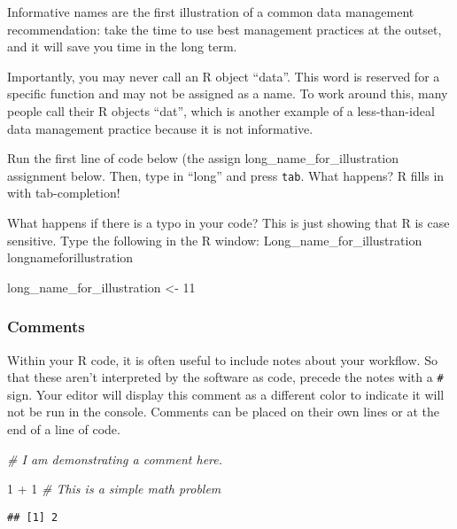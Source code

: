 \documentclass[
]{article}
\newenvironment{Shaded}{\begin{snugshade}}{\end{snugshade}}
\newcommand{\CommentTok}[1]{\textcolor[rgb]{0.56,0.35,0.01}{\textit{#1}}}
\newcommand{\DecValTok}[1]{\textcolor[rgb]{0.00,0.00,0.81}{#1}}
\newcommand{\NormalTok}[1]{#1}
\newcommand{\OtherTok}[1]{\textcolor[rgb]{0.56,0.35,0.01}{#1}}
\newcommand{\SpecialCharTok}[1]{\textcolor[rgb]{0.00,0.00,0.00}{#1}}
\begin{document}
Informative names are the first illustration of a common data management
recommendation: take the time to use best management practices at the
outset, and it will save you time in the long term.

Importantly, you may never call an R object ``data''. This word is
reserved for a specific function and may not be assigned as a name. To
work around this, many people call their R objects ``dat'', which is
another example of a less-than-ideal data management practice because it
is not informative.

Run the first line of code below (the assign
long\_name\_for\_illustration assignment below. Then, type in ``long''
and press \texttt{tab}. What happens? R fills in with tab-completion!

What happens if there is a typo in your code? This is just showing that
R is case sensitive. Type the following in the R window:
Long\_name\_for\_illustration longnameforillustration

\begin{Shaded}
\begin{Highlighting}[]
\NormalTok{long\_name\_for\_illustration }\OtherTok{\textless{}{-}} \DecValTok{11}
\end{Highlighting}
\end{Shaded}

\hypertarget{comments}{%
\subsubsection{Comments}\label{comments}}

Within your R code, it is often useful to include notes about your
workflow. So that these aren't interpreted by the software as code,
precede the notes with a \texttt{\#} sign. Your editor will display this
comment as a different color to indicate it will not be run in the
console. Comments can be placed on their own lines or at the end of a
line of code.

\begin{Shaded}
\begin{Highlighting}[]
\CommentTok{\# I am demonstrating a comment here. }

\DecValTok{1} \SpecialCharTok{+} \DecValTok{1} \CommentTok{\# This is a simple math problem}
\end{Highlighting}
\end{Shaded}

\begin{verbatim}
## [1] 2
\end{verbatim}
\end{document}
